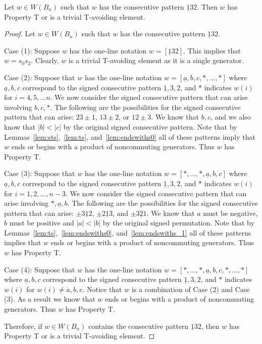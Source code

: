 \begin{lemma}\label{lem:132}
Let $w \in W(B_n)$ such that $w$ has the consecutive pattern $\underline{1}32$. Then $w$ has Property T or is a trivial T-avoiding element.
\begin{proof}
	Let $w \in W(B_n)$ such that $w$ has the consecutive pattern $\underline{1}32$.
	
	Case (1): Suppose $w$ has the one-line notation $w=[\underline{1}32]$. This implies that $w=s_0s_2$. Clearly, $w$ is a trivial T-avoiding element as it is a single generator.
	
	Case (2): Suppose that $w$ has the one-line notation $w=[\underline{a},b,c, \ast, \ldots, \ast]$ where $\underline{a},b,c$ correspond to the signed consecutive pattern $\underline{1},3,2$, and $\ast$ indicates $w(i)$ for $i=4,5, \ldots n$. We now consider the signed consecutive pattern that can arise involving $b,c, \ast$. The following are the possibilities for the signed consecutive pattern that can arise: $23\pm1$, $13 \pm2$, or $12\pm3$. We know that $b,c$, and we also know that $|b|<|c|$ by the original signed consecutive pattern. Note that by Lemmas~\ref{lem:sts},~\ref{lem:ts}, and~\ref{lem:endswiths0} all of these patterns imply that $w$ ends or begins with a product of noncommuting generators. Thus $w$ has Property T.
	
	Case (3): Suppose that $w$ has the one-line notation $w=[\ast, \ldots, \ast, \underline{a},b,c]$ where $\underline{a},b,c$ correspond to the signed consecutive pattern $\underline{1},3,2$, and $\ast$ indicates $w(i)$ for $i=1,2, \ldots ,n-3$. We now consider the signed consecutive pattern that can arise involving $\ast, \underline{a}, b$. The following are the possibilities for the signed consecutive pattern that can arise: $\pm3 \underline{1} 2$, $\pm 2 \underline{1} 3$, and $\pm 3 \underline{2} 1$. We know that $a$ must be negative, $b$ must be positive and $|a|<|b|$ by the original signed permutation. Note that by Lemmas~\ref{lem:ts},~\ref{lem:endswiths0}, and~\ref{lem:endswiths_1} all of these patterns implies that $w$ ends or begins with a product of noncommuting generators. Thus $w$ has Property T. 
	
	Case (4): Suppose that $w$ has the one-line notation $w=[\ast, \ldots, \ast, \underline{a},b,c, \ast, \ldots, \ast]$ where $\underline{a},b,c$ correspond to the signed consecutive pattern $\underline{1},3,2$, and $\ast$ indicates $w(i)$ for $w(i)\neq a,b,c$. Notice that $w$ is a combination of Case (2) and Case (3). As a result we know that $w$ ends or begins with a product of noncommuting generators. Thus $w$ has Property T.
	
	Therefore, if $w \in W(B_n)$ contains the consecutive pattern $\underline{1}32$, then $w$ has Property T or is a trivial T-avoiding element.
\end{proof}	
\end{lemma}

